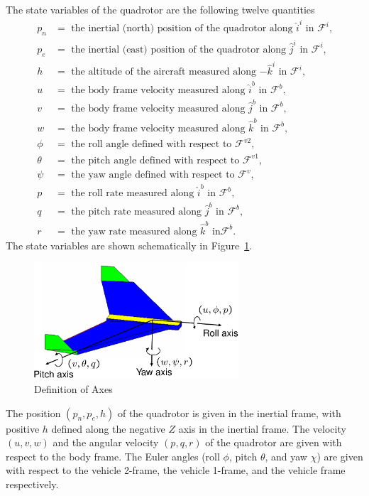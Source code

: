 {The state variables of the quadrotor are the following twelve
quantities
\begin{align*}
p_n &= \text{~the inertial (north) position of the quadrotor along $\hat{i}^i$ in $\mathcal{F}^i$,}\\
p_e &= \text{~the inertial (east) position of the quadrotor along $\hat{j}^i$ in $\mathcal{F}^i$,}\\
h &= \text{~the altitude of the aircraft measured along $-\hat{k}^i$ in $\mathcal{F}^i$,}\\
u &= \text{~the body frame velocity measured along $\hat{i}^b$ in $\mathcal{F}^b$,}\\
v &= \text{~the body frame velocity measured along $\hat{j}^b$ in $\mathcal{F}^b$,}\\
w &= \text{~the body frame velocity measured along $\hat{k}^b$ in $\mathcal{F}^b$,}\\
\phi &= \text{~the roll angle defined with respect to $\mathcal{F}^{v2}$,}\\
\theta &= \text{~the pitch angle defined with respect to $\mathcal{F}^{v1}$,}\\
\psi &= \text{~the yaw angle defined with respect to $\mathcal{F}^v$,} \\
p &= \text{~the roll rate measured along $\hat{i}^b$ in $\mathcal{F}^b$,}\\
q &= \text{~the pitch rate measured along $\hat{j}^b$ in $\mathcal{F}^b$,} \\
r &= \text{~the yaw rate measured along $\hat{k}^b$ in
$\mathcal{F}^b$.}
\end{align*}
The state variables are shown schematically in
Figure~\ref{fig:kin-axis-definition}.
%
\begin{figure}[hhhhtb]
\begin{center}
\includegraphics[width=3.0in]{chap3_multirotor/figures/kin-axis-definition}
\end{center}
\caption{Definition of Axes} \label{fig:kin-axis-definition}
\end{figure}
%
The position $(p_n, p_e, h)$ of the quadrotor is given in the
inertial frame, with positive $h$ defined along the negative $Z$
axis in the inertial frame.  The velocity $(u,v,w)$ and the angular
velocity $(p,q,r)$ of the quadrotor are given with respect to the
body frame.  The Euler angles (roll $\phi$, pitch $\theta$, and yaw
$\chi$) are given with respect to the vehicle 2-frame, the vehicle
1-frame, and the vehicle frame respectively.





}
